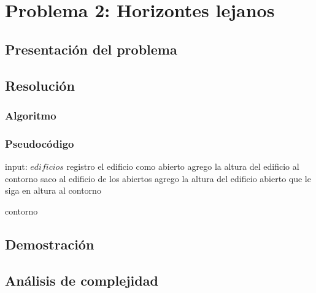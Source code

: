\section{Problema 2: Horizontes lejanos}

\subsection{Presentaci\'on del problema}

\subsection{Resoluci\'on}
\subsubsection{Algoritmo}

\subsubsection{Pseudoc\'odigo}
\begin{algorithm}
\begin{algorithmic}
	\STATE input: $edificios$
			\STATE registro el edificio como abierto
				\STATE agrego la altura del edificio al contorno
			\ENDIF 
		\ELSE
			\STATE saco al edificio de los abiertos
				\STATE agrego la altura del edificio abierto que le siga en altura al contorno
			\ENDIF
		\ENDIF
	\ENDWHILE
	
	\RETURN contorno
\end{algorithmic}
\end{algorithm}

\subsection{Demostraci\'on}

\subsection{An\'alisis de complejidad}

